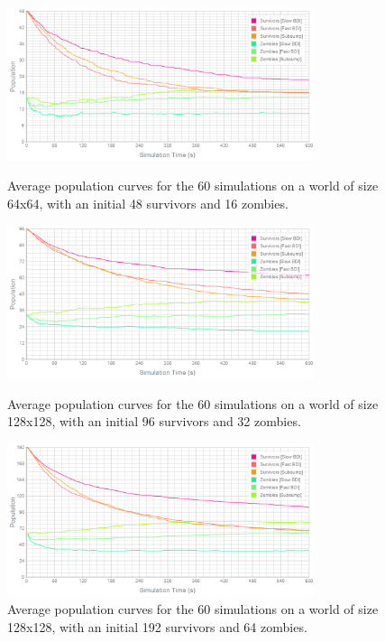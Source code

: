 \documentclass[a4paper,12pt]{article}
\begin{document}
\begin{figure}
\vspace{-20mm}
\centering
\includegraphics[width=0.8\textwidth]{../../Results/64_48_16/population}
\caption{\small Average population curves for the 60 simulations on a world of size 64x64, with an initial 48 survivors and 16 zombies.}
\label{fig:64_48_16_pop}

\vspace{5mm}
\includegraphics[width=0.8\textwidth]{../../Results/128_96_32/population}
\caption{\small Average population curves for the 60 simulations on a world of size 128x128, with an initial 96 survivors and 32 zombies.}
\label{fig:64_96_32_pop}

\vspace{5mm}
\includegraphics[width=0.8\textwidth]{../../Results/128_192_64/population}
\caption{\small Average population curves for the 60 simulations on a world of size 128x128, with an initial 192 survivors and 64 zombies.}
\label{fig:128_192_64_pop}
\end{figure}
\end{document}
